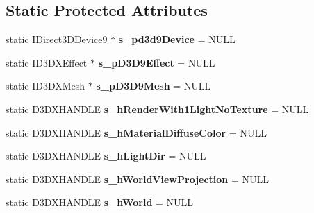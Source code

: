 \subsection*{Static Protected Attributes}
\begin{DoxyCompactItemize}
\item 
\hypertarget{class_c_d_x_u_t_direction_widget_ae59a62b42a0dc54399f3ee2c977a578c}{static I\+Direct3\+D\+Device9 $\ast$ {\bfseries s\+\_\+pd3d9\+Device} = N\+U\+L\+L}\label{class_c_d_x_u_t_direction_widget_ae59a62b42a0dc54399f3ee2c977a578c}

\item 
\hypertarget{class_c_d_x_u_t_direction_widget_a53a2f333bbba78dcaad4287329f851db}{static I\+D3\+D\+X\+Effect $\ast$ {\bfseries s\+\_\+p\+D3\+D9\+Effect} = N\+U\+L\+L}\label{class_c_d_x_u_t_direction_widget_a53a2f333bbba78dcaad4287329f851db}

\item 
\hypertarget{class_c_d_x_u_t_direction_widget_aadadd6cc9848f163c45569246058083d}{static I\+D3\+D\+X\+Mesh $\ast$ {\bfseries s\+\_\+p\+D3\+D9\+Mesh} = N\+U\+L\+L}\label{class_c_d_x_u_t_direction_widget_aadadd6cc9848f163c45569246058083d}

\item 
\hypertarget{class_c_d_x_u_t_direction_widget_a05d884888e1731fed6c247d0203706a6}{static D3\+D\+X\+H\+A\+N\+D\+L\+E {\bfseries s\+\_\+h\+Render\+With1\+Light\+No\+Texture} = N\+U\+L\+L}\label{class_c_d_x_u_t_direction_widget_a05d884888e1731fed6c247d0203706a6}

\item 
\hypertarget{class_c_d_x_u_t_direction_widget_aed28d4a1c89ce1f9a7743e93993c4757}{static D3\+D\+X\+H\+A\+N\+D\+L\+E {\bfseries s\+\_\+h\+Material\+Diffuse\+Color} = N\+U\+L\+L}\label{class_c_d_x_u_t_direction_widget_aed28d4a1c89ce1f9a7743e93993c4757}

\item 
\hypertarget{class_c_d_x_u_t_direction_widget_ad6b6e799578cfb9ccf5403ebbdd0003a}{static D3\+D\+X\+H\+A\+N\+D\+L\+E {\bfseries s\+\_\+h\+Light\+Dir} = N\+U\+L\+L}\label{class_c_d_x_u_t_direction_widget_ad6b6e799578cfb9ccf5403ebbdd0003a}

\item 
\hypertarget{class_c_d_x_u_t_direction_widget_a516c0d74de5a486ceb04ee95fa62d40f}{static D3\+D\+X\+H\+A\+N\+D\+L\+E {\bfseries s\+\_\+h\+World\+View\+Projection} = N\+U\+L\+L}\label{class_c_d_x_u_t_direction_widget_a516c0d74de5a486ceb04ee95fa62d40f}

\item 
\hypertarget{class_c_d_x_u_t_direction_widget_aba967fbf194a2c45e904fabb1ad73068}{static D3\+D\+X\+H\+A\+N\+D\+L\+E {\bfseries s\+\_\+h\+World} = N\+U\+L\+L}\label{class_c_d_x_u_t_direction_widget_aba967fbf194a2c45e904fabb1ad73068}

\end{DoxyCompactItemize}


